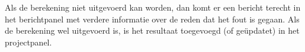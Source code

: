 Als de berekening niet uitgevoerd kan worden, dan komt er een bericht terecht in het berichtpanel met verdere informatie over de reden dat het fout is gegaan. Als de berekening wel uitgevoerd is, is het resultaat toegevoegd (of ge\"{u}pdatet) in het projectpanel.





